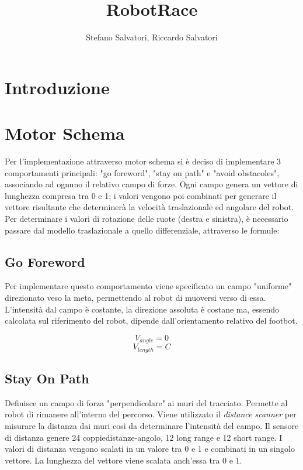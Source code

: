 \documentclass[]{report}
\title{RobotRace}
\author{Stefano Salvatori, Riccardo Salvatori}
\begin{document}
\maketitle

\section{Introduzione}

\section{Motor Schema}
 Per l'implementazione attraverso motor schema si è deciso di implementare 3 comportamenti principali: "go foreword", "stay on path" e "avoid obstacoles", associando ad ognuno il relativo campo di forze.
 Ogni campo genera un vettore di lunghezza compresa tra 0 e 1; i valori vengono poi combinati per generare il vettore risultante che determinerà la  velocità traslazionale ed angolare del robot.
 Per determinare i valori di rotazione delle ruote (destra e sinistra), è necessario passare dal modello traslazionale a quello differenziale, attraverso le formule:
 
 \subsection{Go Foreword}
 
 Per implementare questo comportamento viene specificato un campo "uniforme" direzionato veso la meta, permettendo al robot di muoversi verso di essa.
 L'intensità dal campo è costante, la direzione assoluta è costane ma, essendo calcolata sul riferimento del robot, dipende dall'orientamento relativo del footbot.

$$
V_{angle} = 0
$$
$$
V_{length} = C
$$

 
 
 \subsection{Stay On Path} 
 Definisce un campo di forza "perpendicolare" ai muri del tracciato. Permette al robot di rimanere all'interno del percorso.
 Viene utilizzato il \textit{distance scanner} per misurare la distanza dai muri così da determinare l'intensità del campo.
 Il sensore di distanza genere 24 coppiedistanze-angolo, 12 long range e 12 short range. I valori di distanza vengono scalati in un valore tra 0 e 1 e combinati in un singolo vettore. La lunghezza del vettore viene scalata anch'essa tra 0 e 1.
 
\end{document}
